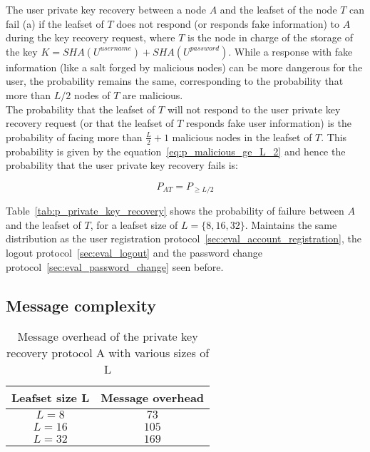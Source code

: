     The user private key recovery between a node $A$ and the leafset of the
node $T$ can fail (a) if the leafset of $T$ does
not respond (or responds fake information) to $A$ during the key recovery
request, where $T$ is the node in charge of the storage of the key $K=
SHA(U^{username}) + SHA(U^{password})$. While a response with fake information (like a salt forged by malicious nodes) can be more dangerous for the
user, the probability remains the same, corresponding to the
probability that more than $L/2$ nodes of $T$ are malicious.\\
    The probability that the leafset of $T$ will not respond to the user private key recovery
request (or that the leafset of $T$ responds fake user information) is the probability of
facing more than $\frac{L}{2} +1$ malicious nodes in the leafset of $T$. This probability is given by the
equation~\ref{eq:p_malicious_ge_L_2} and hence the probability that the user
private key recovery fails is:

\begin{equation} \label{eq:L_2_malicious_A_I}
 P_{AT} = P_{\ge L/2}
\end{equation}

    Table~\eqref{tab:p_private_key_recovery} shows the probability of failure
between $A$ and the leafset of $T$, for a leafset size of $L = \{8,16,32\}$.
Maintains the same distribution as the user registration
protocol~\ref{sec:eval_account_registration}, the
logout protocol~\ref{sec:eval_logout} and the password change
protocol~\ref{sec:eval_password_change} seen before.

    
  \subsection{Message complexity}


\begin{table}
  \centering
  \footnotesize
  \begin{tabular}{|c|c|}
    \hline
     \textbf{Leafset size L} & \textbf{Message overhead}\\
    \hline
      $L = 8$ & $73$\\
    \hline
      $L = 16$ & $105$\\
    \hline
      $L = 32$ & $169$\\
    \hline
  \end{tabular}
  \caption{Message overhead of the private key recovery protocol A with various sizes of L}
  \label{tab:private_key_recovery_a_messages}
\end{table}

